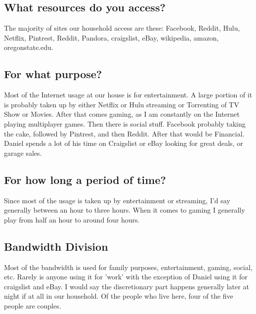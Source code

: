 \documentclass[12pt,letterpaper]{article}
\begin{document}
\subsection{What resources do you access?}
The majority of sites our household access are these:
Facebook, Reddit, Hulu, Netflix, Pintrest, Reddit, Pandora, craigslist,
eBay, wikipedia, amazon, oregonstate.edu.

\subsection{For what purpose?}
Most of the Internet usage at our house is for entertainment. A large
portion of it is probably taken up by either Netflix or Hulu streaming or
Torrenting of TV Show or Movies. After that comes gaming, as I am
constantly on the Internet playing multiplayer games. Then there is
social stuff. Facebook probably taking the cake, followed by Pintrest,
and then Reddit. After that would be Financial. Daniel spends a lot of
his time on Craigslist or eBay looking for great deals, or garage sales.

\subsection{For how long a period of time?}
Since most of the usage is taken up by entertainment or streaming, I'd
say generally between an hour to three hours. When it comes to gaming I
generally play from half an hour to around four hours.

\subsection{Bandwidth Division}
Most of the bandwidth is used for family purposes, entertainment,
gaming, social, etc. Rarely is anyone using it for 'work' with the
exception of Daniel using it for craigslist and eBay. I would say the
discretionary part happens generally later at night if at all in our
household. Of the people who live here, four of the five people are
couples.
\end{document}
